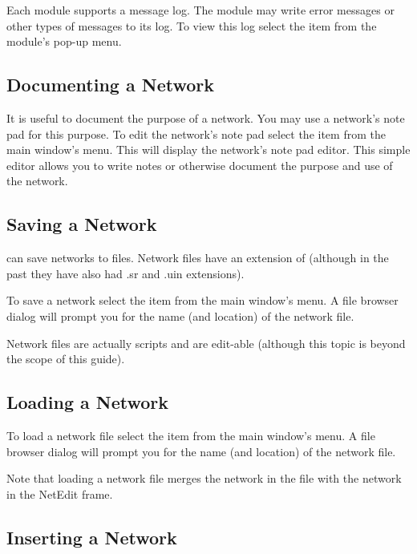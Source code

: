 Each module supports a message log.  The module may write error messages or
other types of messages to its log.  To view this log select the
 item from the module's pop-up menu.

\subsection{Documenting a Network}
\label{sec:docnetwork}

It is useful to document the purpose of a network.  You may use a network's
note pad for this purpose.  To edit the network's note pad select the
 item from the main window's  menu.  This
will display the network's note pad editor.  This simple editor allows you
to write notes or otherwise document the purpose and use of the network.


\subsection{Saving a Network}
\label{sec:savenet}

\sr{} can save networks to files.  Network files have an extension of
 (although in the past they have also had .sr and .uin
extensions).  

To save a network select the  item from the main window's
 menu.  A file browser dialog will prompt you for the
name (and location) of the network file.

Network files are actually  scripts and
are edit-able (although this topic is beyond the scope of this guide).

\subsection{Loading a Network}
\label{sec:opennet}

To load a network file select the  item from the main
window's  menu.   A file browser dialog will prompt you for the
name (and location) of the network file.

Note that loading a network file merges the network in the file with the
network in the NetEdit frame.  

\subsection{Inserting a Network}
\label{sec:insertnetwork}

